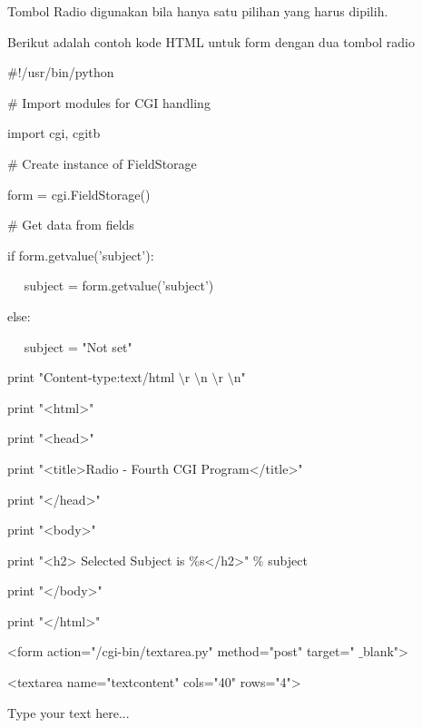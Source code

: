 Tombol Radio digunakan bila hanya satu pilihan yang harus dipilih. \par
\vspace{12pt}
\noindent 
Berikut adalah contoh kode HTML untuk form dengan dua tombol radio  \par
\vspace{12pt}
\vspace{12pt}
\noindent 
 $  \#  $!/usr/bin/python \par
\vspace{12pt}
\noindent 
 $  \#  $ Import modules for CGI handling  \par
\noindent 
import cgi, cgitb  \par
\vspace{12pt}
\noindent 
 $  \#  $ Create instance of FieldStorage  \par
\noindent 
form = cgi.FieldStorage()  \par
\vspace{12pt}
\noindent 
 $  \#  $ Get data from fields \par
\noindent 
if form.getvalue('subject'): \par
\noindent 
~~ subject = form.getvalue('subject') \par
\noindent 
else: \par
\noindent 
~~ subject = "Not set" \par
\vspace{12pt}
\noindent 
print "Content-type:text/html $  \setminus  $r $  \setminus  $n $  \setminus  $r $  \setminus  $n" \par
\noindent 
print "<html>" \par
\noindent 
print "<head>" \par
\noindent 
print "<title>Radio - Fourth CGI Program</title>" \par
\noindent 
print "</head>" \par
\noindent 
print "<body>" \par
\noindent 
print "<h2> Selected Subject is  $  \%  $s</h2>"  $  \%  $ subject \par
\noindent 
print "</body>" \par
\noindent 
print "</html>" \par
\vspace{12pt}
\noindent 
<form action="/cgi-bin/textarea.py" method="post" target=" $  \_  $blank"> \par
\noindent 
<textarea name="textcontent" cols="40" rows="4"> \par
\noindent 
Type your text here... \par
